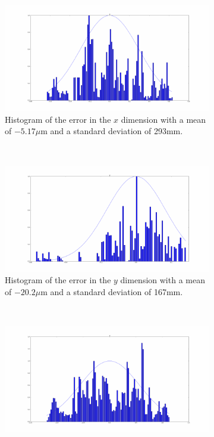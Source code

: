 \begin{figure}
  \begin{subfigure}{0.45\textwidth}
    \includegraphics[width=\textwidth]{figures/chapter3/norm_x}
    \caption{Histogram of the error in the $x$ dimension with a mean of $-5.17\mu$m and a standard deviation of 293mm.}
  \end{subfigure}
~
  \begin{subfigure}{0.45\textwidth}
     \includegraphics[width=\textwidth]{figures/chapter3/norm_y}
     \caption{Histogram of the error in the $y$ dimension with a mean of $-20.2\mu$m and a standard deviation of 167mm.}
  \label{fig:norm-y}
  \end{subfigure}
~
  \begin{subfigure}{0.45\textwidth}
     \includegraphics[width=\textwidth]{figures/chapter3/norm_z.pdf}

\end{subfigure}
\end{figure}
